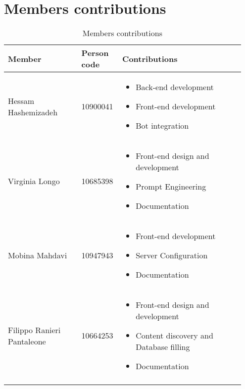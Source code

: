\chapter{Members contributions}
\begin{longtable}
    {|m{0.3\linewidth}|m{0.15\linewidth}|m{0.5\linewidth}|}
            \hline
            \textbf{Member} & \textbf{Person code} & \textbf{Contributions}\\
            \hline
            \endhead
                Hessam Hashemizadeh & 10900041 &
                \begin{itemize}
                    \item Back-end development
                    \item Front-end development
                    \item Bot integration
                \end{itemize} \\
            \hline
                 Virginia Longo & 10685398 &
                 \begin{itemize}
                    \item Front-end design and development
                    \item Prompt Engineering
                    \item Documentation
                \end{itemize} \\
            \hline
                 Mobina Mahdavi & 10947943 &
                 \begin{itemize}
                    \item Front-end development
                    \item Server Configuration
                    \item Documentation
                \end{itemize} \\
            \hline
                Filippo Ranieri Pantaleone & 10664253 &
                \begin{itemize}
                    \item Front-end design and development
                    \item Content discovery and Database filling
                    \item Documentation
                \end{itemize} \\
            \hline
            \caption{Members contributions}
            \label{table:mem_contributions}
\end{longtable}
